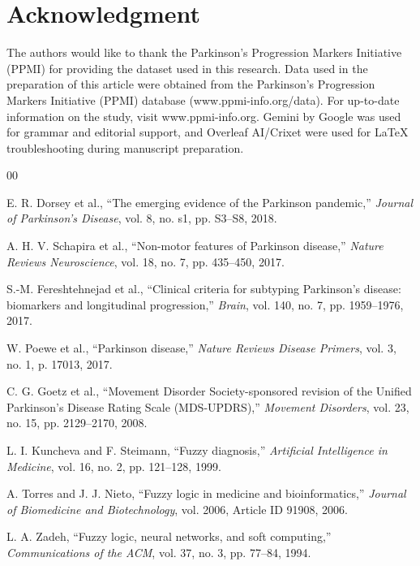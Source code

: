 \documentclass[journal,twoside,web]{ieeecolor}
\begin{document}
\clearpage
\section*{Acknowledgment}
The authors would like to thank the Parkinson's Progression Markers Initiative (PPMI) for providing the dataset used in this research. Data used in the preparation of this article were obtained from the Parkinson's Progression Markers Initiative (PPMI) database (www.ppmi-info.org/data). For up-to-date information on the study, visit www.ppmi-info.org. Gemini by Google was used for grammar and editorial support, and Overleaf AI/Crixet were used for LaTeX troubleshooting during manuscript preparation.





\begin{thebibliography}{00}

E. R. Dorsey et al., ``The emerging evidence of the Parkinson pandemic,'' \textit{Journal of Parkinson's Disease}, vol. 8, no. s1, pp. S3--S8, 2018.

A. H. V. Schapira et al., ``Non-motor features of Parkinson disease,'' \textit{Nature Reviews Neuroscience}, vol. 18, no. 7, pp. 435--450, 2017.

S.-M. Fereshtehnejad et al., ``Clinical criteria for subtyping Parkinson's disease: biomarkers and longitudinal progression,'' \textit{Brain}, vol. 140, no. 7, pp. 1959--1976, 2017.

W. Poewe et al., ``Parkinson disease,'' \textit{Nature Reviews Disease Primers}, vol. 3, no. 1, p. 17013, 2017.

C. G. Goetz et al., ``Movement Disorder Society-sponsored revision of the Unified Parkinson's Disease Rating Scale (MDS-UPDRS),'' \textit{Movement Disorders}, vol. 23, no. 15, pp. 2129--2170, 2008.

L. I. Kuncheva and F. Steimann, ``Fuzzy diagnosis,'' \textit{Artificial Intelligence in Medicine}, vol. 16, no. 2, pp. 121--128, 1999.

A. Torres and J. J. Nieto, ``Fuzzy logic in medicine and bioinformatics,'' \textit{Journal of Biomedicine and Biotechnology}, vol. 2006, Article ID 91908, 2006.

L. A. Zadeh, ``Fuzzy logic, neural networks, and soft computing,'' \textit{Communications of the ACM}, vol. 37, no. 3, pp. 77--84, 1994.


\end{thebibliography}
\end{document}
